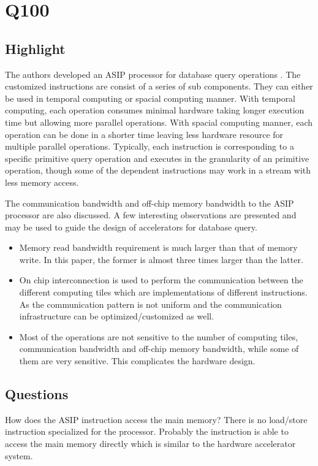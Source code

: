 \section{Q100} %
\subsection{Highlight}
The authors developed an ASIP processor for database query operations \cite{wu2015q100, wu2014q100}. 
The customized instructions are consist of a series of sub components. They can either be used in
temporal computing or spacial computing manner. With temporal computing, each operation consumes
minimal hardware taking longer execution time but allowing more parallel operations. With spacial 
computing manner, each operation can be done in a shorter time leaving less hardware resource for
multiple parallel operations. Typically, each instruction is corresponding to a specific primitive
query operation and executes in the granularity of an primitive operation, though some of the dependent
instructions may work in a stream with less memory access.

The communication bandwidth and off-chip memory bandwidth to the ASIP processor are also discussed.
A few interesting observations are presented and may be used to guide the design of accelerators for
database query.

\begin{itemize}
    \item Memory read bandwidth requirement is much larger than that of memory write. In this paper,
        the former is almost three times larger than the latter.
    \item On chip interconnection is used to perform the communication between the different
        computing tiles which are implementations of different instructions. As the communication
        pattern is not uniform and the communication infrastructure can be optimized/customized as well.
    \item Most of the operations are not sensitive to the number of computing tiles, communication
        bandwidth and off-chip memory bandwidth, while some of them are very sensitive. This
        complicates the hardware design.
\end{itemize}

\subsection{Questions}
How does the ASIP instruction access the main memory? There is no load/store instruction specialized
for the processor. Probably the instruction is able to access the main memory directly which is
similar to the hardware accelerator system.

